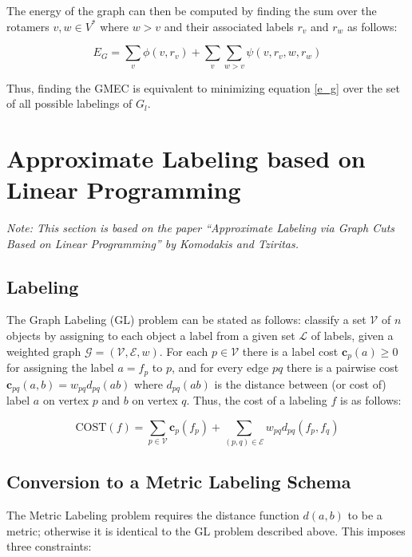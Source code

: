 \documentclass[11pt]{article}
\begin{document}
	The energy of the graph can then be computed by finding the sum over the rotamers 
	$v,w\in V^*$ where $w > v$ and their associated labels $r_v$ and $r_w$ as
	follows:
	
	\begin{equation} \label{e_g}
	    E_G = 
	    \sum\limits_{v} \phi(v, r_v) + 
	    \sum\limits_{v} \sum\limits_{w > v} \psi(v,r_v, w, r_w)
	   \end{equation}
	
	Thus, finding the GMEC is equivalent to minimizing equation \ref{e_g}
	over the set of all possible labelings of $G_l$. 
	
	\section{Approximate Labeling based on Linear Programming}
	
	\textit{Note: This section is based on the paper ``Approximate Labeling via
		Graph Cuts Based on Linear Programming'' by Komodakis and Tziritas.}
	
	\subsection{Labeling}
	
	The Graph Labeling (GL) problem can be stated as follows: classify a set 
	$\mathcal{V}$ of $n$ objects by assigning to each object a label from a given
	set $\mathcal{L}$ of labels, given a weighted graph
	$\mathcal{G}=(\mathcal{V},\mathcal{E},w)$. For each $p \in \mathcal{V}$ there
	is a label cost $\textbf{c}_{p}(a) \geq 0$ for assigning the label $a=f_p$ to
	$p$, and for every edge $pq$ there is a pairwise cost
	$\textbf{c}_{pq}(a,b) =  w_{pq}d_{pq}(ab)$ where $d_{pq}(ab)$ is the distance
	between (or cost of) label $a$ on vertex $p$ and $b$ on vertex $q$. Thus,
	the cost of a labeling $f$ is as follows:
	
	\begin{equation} \label{k_cost}
	    \text{COST}(f) = 
	    \sum\limits_{p \in \mathcal{V}} \textbf{c}_{p}(f_p) + 
	    \sum\limits_{(p,q) \in \mathcal{E}} w_{pq}d_{pq}(f_p,f_q)
	   \end{equation}

    	
	\subsection{Conversion to a Metric Labeling Schema}
	
	The Metric Labeling problem requires the distance function $d(a,b)$ to 
	be a metric; otherwise it is identical to the GL problem described above.
	This imposes three constraints:
	
\end{document}
